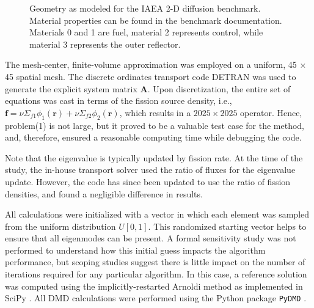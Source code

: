 \begin{figure}[htb!]
\caption{Geometry as modeled for the IAEA 2-D diffusion benchmark.  Material properties can be found in the benchmark documentation.  Materials 0 and 1 are fuel, material 2 represents control, while material 3 represents the outer reflector.}
\label{fig:iaea2d}
\end{figure}

The mesh-center, finite-volume approximation was employed on a uniform, 45 $\times$ 45 spatial mesh.
The discrete ordinates transport code DETRAN was used to generate the explicit system matrix $\mathbf{A}$.
Upon discretization, the entire set of equations was cast in terms of the fission source density, i.e., $\mathbf{f} = \nu\Sigma_{f1}\phi_1(\mathbf{r}) + \nu\Sigma_{f2}\phi_2(\mathbf{r})$, which results in a $2025 \times 2025$ operator. 
Hence, problem(1) is not large, but it proved to be a valuable test case for the method, and, therefore, ensured a reasonable computing time while debugging the code.

Note that the eigenvalue is typically updated by fission rate.
At the time of the study, the in-house transport solver used the ratio of fluxes for the eigenvalue update.
However, the code has since been updated to use the ratio of fission densities, and found a negligible difference in results.

All calculations were initialized with a vector in which each element was sampled from the uniform distribution $U[0, 1]$. 
This randomized starting vector helps to ensure that all eigenmodes can be present.
A formal sensitivity study was not performed to understand how this initial guess impacts the algorithm performance, but scoping studies suggest there is little impact on the number of iterations required for any particular algorithm.
In this case, a reference solution was computed using the implicitly-restarted Arnoldi method as implemented in SciPy \cite{scipy}.
All DMD calculations were performed using the Python package {\tt PyDMD} \cite{pydmd}.

